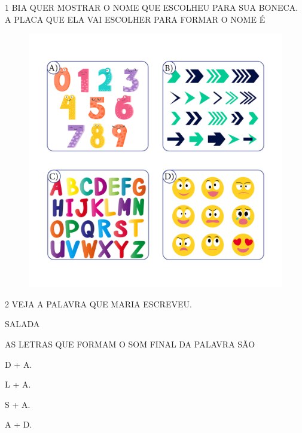 


\pagebreak

\num{1} BIA QUER MOSTRAR O NOME QUE ESCOLHEU PARA SUA BONECA.
A PLACA QUE ELA VAI ESCOLHER PARA FORMAR O NOME É

\begin{figure}[H]
\includegraphics[width=\textwidth]{media/image239a242.png}
\end{figure}

\num{2} VEJA A PALAVRA QUE MARIA ESCREVEU.

\begin{myquote}
\centering\large{SALADA}
\end{myquote}

AS LETRAS QUE FORMAM O SOM FINAL DA PALAVRA SÃO

\begin{multicols}{2}
\begin{escolha}
\item D + A.

\item L + A.

\item S + A.

\item A + D.
\end{escolha}
\end{multicols}

